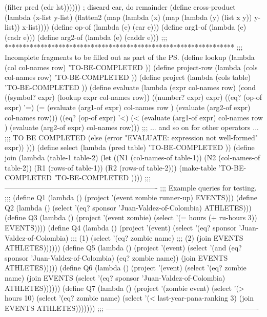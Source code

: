            (filter pred (cdr lst))))))        ;    discard car, do remainder
\null
(define cross-product
    (lambda (x-list y-list)
        (flatten2 (map (lambda (x)
                           (map (lambda (y) (list x y))
                                y-list))
                       x-list))))
\null
(define op-of   (lambda (e) (car e)))
(define arg1-of (lambda (e) (cadr e)))
(define arg2-of (lambda (e) (caddr e)))
\null
;;; ****************************************************************
;;; Incomplete fragments to be filled out as part of the PS.
\null
(define lookup
  (lambda (col col-names row)
    'TO-BE-COMPLETED    ))
\null
(define project-row
  (lambda (cols col-names row)
    'TO-BE-COMPLETED    ))
\null
(define project
  (lambda (cols table)
    'TO-BE-COMPLETED    ))
\null
(define evaluate
  (lambda (expr col-names row)
    (cond
      ((symbol? expr)      (lookup expr col-names row))
      ((number? expr)      expr)
      ((eq? (op-of expr) '=) (= (evaluate (arg1-of expr) col-names row )
                                (evaluate (arg2-of expr) col-names row)))
      ((eq? (op-of expr) '<) (< (evaluate (arg1-of expr) col-names row )
                                (evaluate (arg2-of expr) col-names row)))
\null
;;;   ...  and so on for other operators ...
;;;        TO BE COMPLETED
\null
      (else (error "EVALUATE: expression not well-formed" expr))
    )))
\null
(define select
  (lambda (pred table)
    'TO-BE-COMPLETED   ))
\null
(define join
  (lambda (table-1 table-2)
    (let  ((N1 (col-names-of table-1))
           (N2 (col-names-of table-2))
           (R1 (rows-of table-1))
           (R2 (rows-of table-2)))
      (make-table
        'TO-BE-COMPLETED   
        'TO-BE-COMPLETED    ))))
\null
;;; ----------------------------------------------------------------
;;; Example queries for testing.
;;;
(define Q1 (lambda ()
    (project '(event zombie runner-up)
             EVENTS)))
\null
(define Q2 (lambda ()
    (select '(eq? sponsor 'Juan-Valdez-of-Colombia)
             ATHLETES)))
\null
(define Q3 (lambda ()
    (project '(event zombie)
        (select '(= hours (+ ru-hours 3))
            EVENTS))))
\null
(define Q4 (lambda ()
    (project '(event)
             (select '(eq? sponsor 'Juan-Valdez-of-Colombia)   ;;; (1)
                     (select '(eq? zombie name)                ;;; (2)
                             (join EVENTS ATHLETES))))))
\null
(define Q5 (lambda ()
    (project '(event)
             (select '(and (eq? sponsor 'Juan-Valdez-of-Colombia)
                           (eq? zombie name))
                     (join EVENTS ATHLETES)))))
\null
(define Q6 (lambda ()
    (project '(event)
             (select '(eq? zombie name)
                     (join EVENTS
                           (select '(eq? sponsor 'Juan-Valdez-of-Colombia)
                                    ATHLETES))))))
\null
(define Q7 (lambda ()
    (project '(zombie event)
             (select '(> hours 10)
                     (select '(eq? zombie name)
                             (select '(< last-year-pana-ranking 3)
                                     (join EVENTS
                                           ATHLETES)))))))
\null
;;; ----------------------------------------------------------------
 \endlisp



